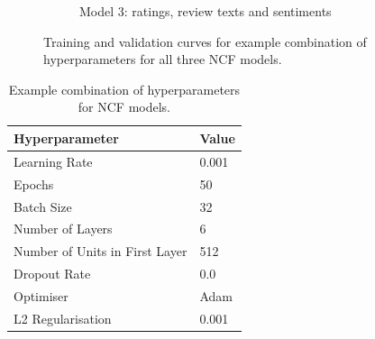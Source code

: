 \begin{figure}[h]
\begin{subfigure}{0.49\textwidth}
        \caption{Model 3: ratings, review texts and sentiments}
        \label{fig:model3_sample}
    \end{subfigure}
    \caption{Training and validation curves for example combination of hyperparameters for all three NCF models.}
    \label{train_val_curves_sample}
\end{figure}


\begin{table}[h]
    \centering
    \begin{tabular}{|p{6cm}|p{3cm}|}
    \hline
    \textbf{Hyperparameter} & \textbf{Value}  \\
    \hline
    Learning Rate & 0.001 \\
    Epochs & 50 \\
    Batch Size & 32 \\
    Number of Layers & 6 \\
    Number of Units in First Layer & 512\\
    Dropout Rate & 0.0 \\
    Optimiser & Adam \\
    L2 Regularisation & 0.001 \\
    \hline
    \end{tabular}
    \caption{Example combination of hyperparameters for NCF models.}
    \label{tab:hyper_sample}
    \end{table}



